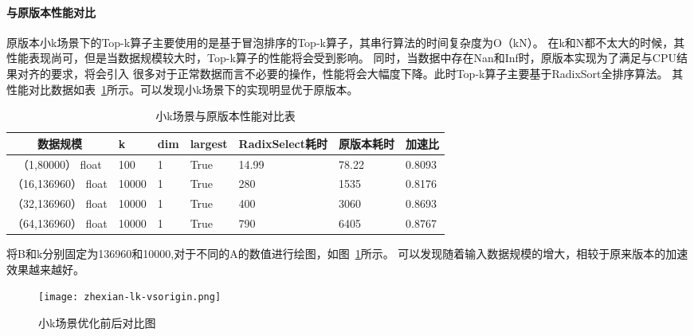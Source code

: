 \paragraph{与原版本性能对比}
原版本小k场景下的Top-k算子主要使用的是基于冒泡排序的Top-k算子，其串行算法的时间复杂度为O（kN）。
在k和N都不太大的时候，其性能表现尚可，但是当数据规模较大时，Top-k算子的性能将会受到影响。
同时，当数据中存在Nan和Inf时，原版本实现为了满足与CPU结果对齐的要求，将会引入
很多对于正常数据而言不必要的操作，性能将会大幅度下降。此时Top-k算子主要基于RadixSort全排序算法。
其性能对比数据如表~\ref{tab:bench_littlek}所示。可以发现小k场景下的实现明显优于原版本。
\begin{table}
    \centering
    \caption{小k场景与原版本性能对比表}
    \label{tab:bench_littlek}
    \begin{tabular}{cllllll}
        \toprule
        数据规模       &k  & dim  & largest & RadixSelect耗时    & 原版本耗时 &加速比\\
        \midrule
        （1,80000） float&100&  1     & True      & 14.99 & 78.22 & 0.8093\\

        （16,136960） float&10000&  1     & True      & 280 & 1535 & 0.8176\\
        （32,136960） float&10000&  1     & True      & 400 & 3060 & 0.8693\\
        （64,136960） float&10000&  1     & True      & 790 & 6405 & 0.8767\\
        
        
        

        \bottomrule
    \end{tabular}
    \end{table}

将B和k分别固定为136960和10000,对于不同的A的数值进行绘图，如图~\ref{fig:bench_littlek-vsorigin}所示。
可以发现随着输入数据规模的增大，相较于原来版本的加速效果越来越好。
    \begin{figure}[ht]
        \centering
        \texttt{[image: zhexian-lk-vsorigin.png]}
        \caption{小k场景优化前后对比图}
        \label{fig:bench_littlek-vsorigin}
    \end{figure}
    


